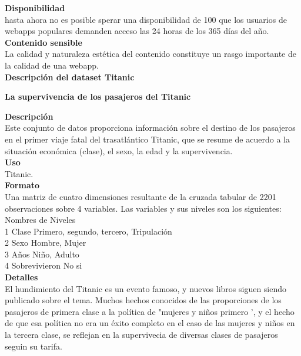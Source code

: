 \documentclass[12pt]{report}
\begin{document}
\textbf{Disponibilidad}\\

hasta ahora no es posible sperar una disponibilidad de 100%
que los usuarios de webapps populares demanden acceso las 24 horas de los 365 días del año.\\

\textbf{Contenido sensible}\\

La calidad y naturaleza estética del contenido constituye un rasgo importante de la calidad de una webapp.\\


\textbf{Descripción del dataset Titanic}\\
\begin{center}

\textbf{La supervivencia de los pasajeros del Titanic}\end{center}

\textbf{Descripción}\\

Este conjunto de datos proporciona información sobre el destino de los pasajeros en el primer viaje fatal del trasatlántico Titanic, que se resume de acuerdo a la situación económica (clase), el sexo, la edad y la supervivencia.\\

\textbf{Uso}\\

Titanic.\\

\textbf{Formato}\\

Una matriz de cuatro dimensiones resultante de la cruzada tabular de 2201 observaciones sobre 4 variables. Las variables y sus niveles son los siguientes:\\

Nombres de	Niveles\\
1	Clase	Primero, segundo, tercero, Tripulación\\
2	Sexo	Hombre, Mujer\\
3	Años	Niño, Adulto\\
4	Sobrevivieron	No si\\

\textbf{Detalles}\\

El hundimiento del Titanic es un evento famoso, y nuevos libros siguen siendo publicado sobre el tema. Muchos hechos conocidos de las proporciones de los pasajeros de primera clase a la política de "mujeres y niños primero ', y el hecho de que esa política no era un éxito completo en el caso de las mujeres y niños en la tercera clase, se reflejan en la supervivecia de diversas clases de pasajeros seguin su tarifa.\\
\end{document}
